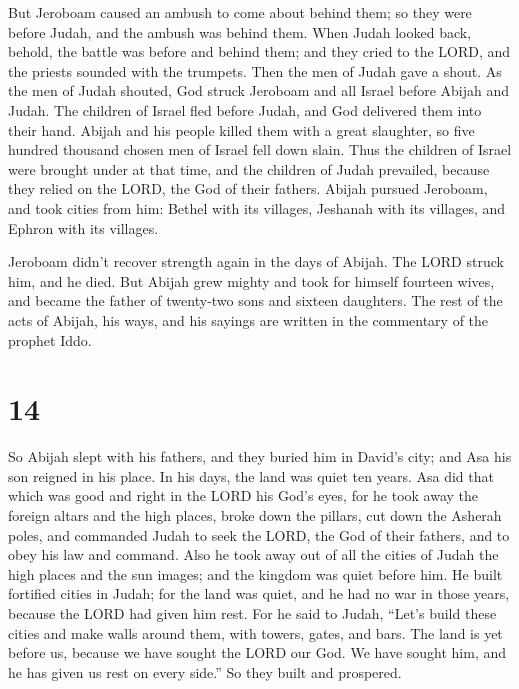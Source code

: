  But Jeroboam caused an ambush to come about behind them;
so they were before Judah, and the ambush was behind them. 
When Judah looked back, behold, the battle was before and behind them;
and they cried to the LORD, and the priests sounded with the trumpets.
 Then the men of Judah gave a shout. As the men of Judah
shouted, God struck Jeroboam and all Israel before Abijah and Judah.
 The children of Israel fled before Judah, and God
delivered them into their hand.  Abijah and his people
killed them with a great slaughter, so five hundred thousand chosen men
of Israel fell down slain.  Thus the children of Israel
were brought under at that time, and the children of Judah prevailed,
because they relied on the LORD, the God of their fathers. 
Abijah pursued Jeroboam, and took cities from him: Bethel with its
villages, Jeshanah with its villages, and Ephron with its villages.

 Jeroboam didn't recover strength again in the days of
Abijah. The LORD struck him, and he died.  But Abijah grew
mighty and took for himself fourteen wives, and became the father of
twenty-two sons and sixteen daughters.  The rest of the
acts of Abijah, his ways, and his sayings are written in the commentary
of the prophet Iddo.

\hypertarget{section-13}{%
\section{14}\label{section-13}}

 So Abijah slept with his fathers, and they buried him in
David's city; and Asa his son reigned in his place. In his days, the
land was quiet ten years.  Asa did that which was good and
right in the LORD his God's eyes,  for he took away the
foreign altars and the high places, broke down the pillars, cut down the
Asherah poles,  and commanded Judah to seek the LORD, the
God of their fathers, and to obey his law and command.  Also
he took away out of all the cities of Judah the high places and the sun
images; and the kingdom was quiet before him.  He built
fortified cities in Judah; for the land was quiet, and he had no war in
those years, because the LORD had given him rest.  For he
said to Judah, ``Let's build these cities and make walls around them,
with towers, gates, and bars. The land is yet before us, because we have
sought the LORD our God. We have sought him, and he has given us rest on
every side.'' So they built and prospered.

